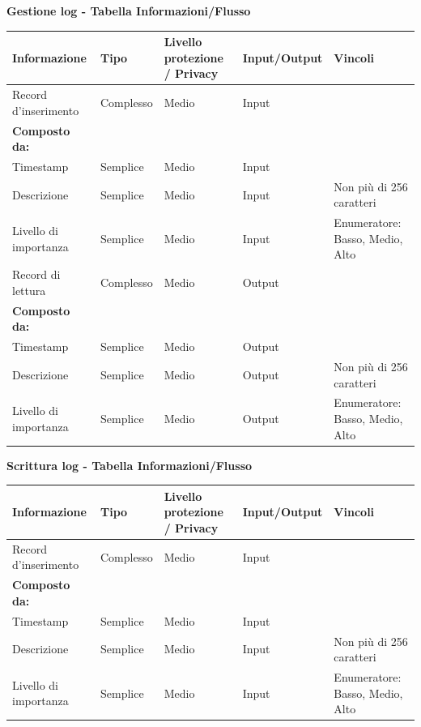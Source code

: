 \documentclass[a4paper]{article}
\begin{document}
\textbf{Gestione log  - Tabella Informazioni/Flusso}

\begin{center}
    \begin{tabularx}{1\textwidth}{|X|X|X|X|X|}
        \hline
        \textbf{Informazione} &\textbf{Tipo} & \textbf{Livello protezione / Privacy} & \textbf{Input/Output} & \textbf{Vincoli}\\
        \hline
        \hline
        Record d'inserimento & Complesso & Medio & Input & \\
        \textbf{Composto da:} & & & & \\
        Timestamp & Semplice & Medio & Input & \\
        Descrizione & Semplice & Medio & Input & Non più di 256 caratteri \\
        Livello di importanza & Semplice & Medio & Input & Enumeratore: Basso, Medio, Alto\\
        \hline
        Record di lettura & Complesso & Medio & Output & \\
        \textbf{Composto da:} & & & & \\
        Timestamp & Semplice & Medio & Output & \\
        Descrizione & Semplice & Medio & Output & Non più di 256 caratteri \\
        Livello di importanza & Semplice & Medio & Output & Enumeratore: Basso, Medio, Alto\\
        \hline
    \end{tabularx}
\end{center}

\textbf{Scrittura log  - Tabella Informazioni/Flusso}

\begin{center}
    \begin{tabularx}{1\textwidth}{|X|X|X|X|X|}
        \hline
        \textbf{Informazione} &\textbf{Tipo} & \textbf{Livello protezione / Privacy} & \textbf{Input/Output} & \textbf{Vincoli}\\
        \hline
        \hline
        Record d'inserimento & Complesso & Medio & Input & \\
        \textbf{Composto da:} & & & & \\
        Timestamp & Semplice & Medio & Input & \\
        Descrizione & Semplice & Medio & Input & Non più di 256 caratteri \\
        Livello di importanza & Semplice & Medio & Input & Enumeratore: Basso, Medio, Alto\\
        \hline
    \end{tabularx}
\end{center}
\end{document}
